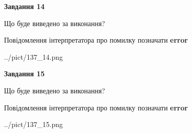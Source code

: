 \documentclass[11pt, ukrainian]{article}
\begin{document}
{\begin {large}
{\begin {center}\textbf{Завдання 14}\end {center}}\par
Що буде виведено за виконання? \par
Повідомлення інтерпретатора про помилку позначати \textbf{error}

\begin{center}
	{../pict/137_14.png}
\end{center}
\newpage

{\begin {center}\textbf{Завдання 15}\end {center}}\par
Що буде виведено за виконання? \par
Повідомлення інтерпретатора про помилку позначати \textbf{error}

\begin{center}
	{../pict/137_15.png}
\end{center}
\newpage

\end {large}}
\end{document}
